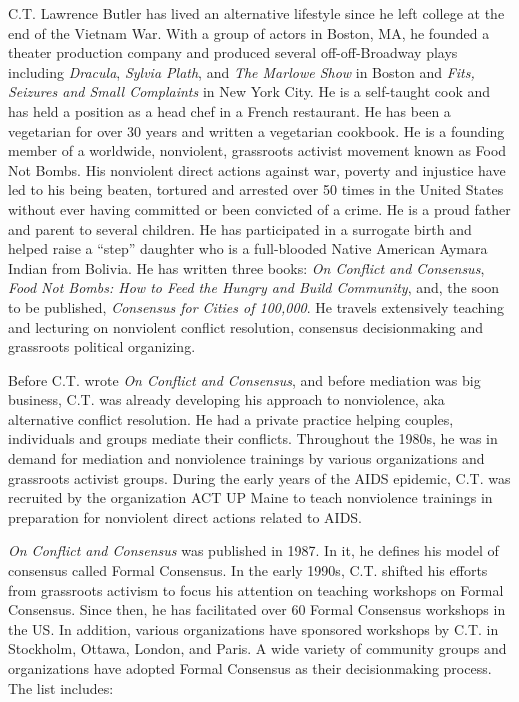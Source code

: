 C.T. Lawrence Butler has lived an alternative lifestyle since he left college at the end of the Vietnam War. With a group of actors in Boston, MA, he founded a theater production company and produced several off-off-Broadway plays including \emph{Dracula}, \emph{Sylvia Plath}, and \emph{The Marlowe Show} in Boston and \emph{Fits, Seizures and Small Complaints} in New York City. He is a self-taught cook and has held a position as a head chef in a French restaurant. He has been a vegetarian for over 30 years and written a vegetarian cookbook. He is a founding member of a worldwide, nonviolent, grassroots activist movement known as Food Not Bombs. His nonviolent direct actions against war, poverty and injustice have led to his being beaten, tortured and arrested over 50 times in the United States without ever having committed or been convicted of a crime. He is a proud father and parent to several children. He has participated in a surrogate birth and helped raise a ``step'' daughter who is a full-blooded Native American Aymara Indian from Bolivia. He has written three books: \emph{On Conflict and Consensus}, \emph{Food Not Bombs: How to Feed the Hungry and Build Community}, and, the soon to be published, \emph{Consensus for Cities of 100,000}. He travels extensively teaching and lecturing on nonviolent conflict resolution, consensus decisionmaking and grassroots political organizing. 

Before C.T. wrote \emph{On Conflict and Consensus}, and before mediation was big business, C.T. was already developing his approach to nonviolence, aka alternative conflict resolution. He had a private practice helping couples, individuals and groups mediate their conflicts. Throughout the 1980s, he was in demand for mediation and nonviolence trainings by various organizations and grassroots activist groups. During the early years of the AIDS epidemic, C.T. was recruited by the organization ACT UP Maine to teach nonviolence trainings in preparation for nonviolent direct actions related to AIDS.

\emph{On Conflict and Consensus} was published in 1987. In it, he defines his model of consensus called Formal Consensus. In the early 1990s, C.T. shifted his efforts from grassroots activism to focus his attention on teaching workshops on Formal Consensus. Since then, he has facilitated over 60 Formal Consensus workshops in the US. In addition, various organizations have sponsored workshops by C.T. in Stockholm, Ottawa, London, and Paris. A wide variety of community groups and organizations have adopted Formal Consensus as their decisionmaking process. The list includes:

